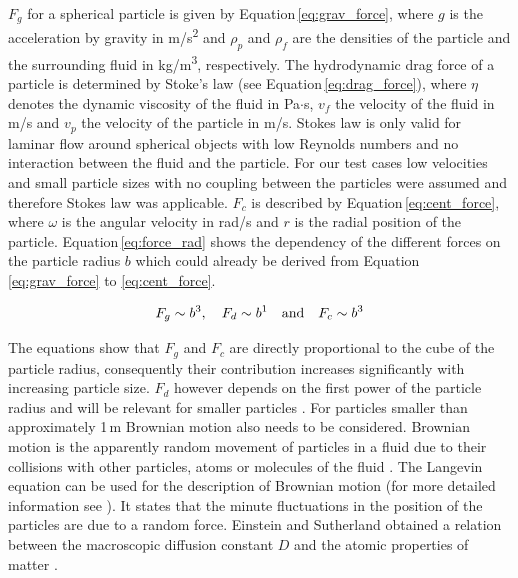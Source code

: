 $F_{g}$ for a spherical particle is given by Equation\,\ref{eq:grav_force}, where $g$ is the acceleration by gravity in m/s\textsuperscript{2} and $\rho_{p}$ and $\rho_{f}$ are the densities of the particle and the surrounding fluid in kg/m\textsuperscript{3}, respectively. The hydrodynamic drag force of a particle is determined by Stoke's law (see Equation\,\ref{eq:drag_force}), where $\eta$ denotes the dynamic viscosity of the fluid in Pa$\cdotp$s, $v_{f}$ the velocity of the fluid in m/s and $v_{p}$ the velocity of the particle in m/s. Stokes law is only valid for laminar flow around spherical objects with low Reynolds numbers and no interaction between the fluid and the particle. For our test cases low velocities and small particle sizes with no coupling between the particles were assumed and therefore Stokes law was applicable. $F_{c}$ is described by Equation\,\ref{eq:cent_force}, where $\omega$ is the angular velocity in rad/s and $r$ is the radial position of the particle. Equation\,\ref{eq:force_rad} shows the dependency of the different forces on the particle radius $b$ which could already be derived from Equation\,\ref{eq:grav_force} to \ref{eq:cent_force}. 

\begin{equation}
\label{eq:force_rad}
\centering
F_{g}\sim b^{3}, \quad F_{d}\sim b^{1} \quad \textrm{and} \quad F_{c}\sim b^{3}
\end{equation}

The equations show that $F_{g}$ and $F_{c}$ are directly proportional to the cube of the particle radius, consequently their contribution increases significantly with increasing particle size. $F_{d}$ however depends on the first power of the particle radius and will be relevant for smaller particles \cite{svoboda2004magnetic,oberteuffer1974magnetic}. For particles smaller than approximately 1\,\textmu m Brownian motion also needs to be considered. Brownian motion is the apparently random movement of particles in a fluid due to their collisions with other particles, atoms or molecules of the fluid \cite{brown1828xxvii}. The Langevin equation can be used for the description of Brownian motion (for more detailed information see \cite{Langevin,BrownianDynamics,BrownianModel}). It states that the minute fluctuations in the position of the particles are due to a random force. Einstein and Sutherland obtained a relation between the macroscopic diffusion constant $D$ and the atomic properties of matter \cite{einstein1906theorie,einstein1905molekularkinetischen,sutherland1905lxxv}. 


